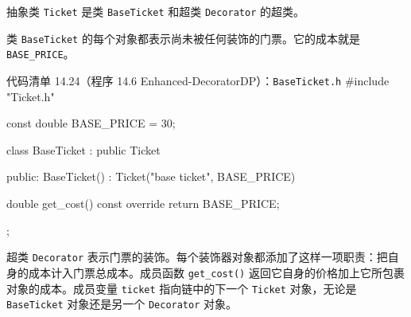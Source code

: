 抽象类 \texttt{Ticket} 是类 \texttt{Base\allowbreak{}Ticket} 和超类 \texttt{Decorator} 的超类。

\par

类 \texttt{Base\allowbreak{}Ticket} 的每个对象都表示尚未被任何装饰的门票。它的成本就是 \texttt{BASE\_\allowbreak{}PRICE}。

\begin{codeboxt}{代码清单 14.24（程序 14.6 Enhanced-DecoratorDP）：\texttt{Base\allowbreak{}Ticket.\allowbreak{}h}}
#include "Ticket.h"

const double BASE_PRICE = 30;

class BaseTicket : public Ticket
{
public:
    BaseTicket() : Ticket("base ticket", BASE_PRICE) {}

    double get_cost() const override { return BASE_PRICE; }
};
\end{codeboxt}

超类 \texttt{Decorator} 表示门票的装饰。每个装饰器对象都添加了这样一项职责：把自身的成本计入门票总成本。成员函数 \texttt{get\_\allowbreak{}cost(\allowbreak{})\allowbreak{}} 返回它自身的价格加上它所包裹对象的成本。成员变量 \texttt{ticket} 指向链中的下一个 \texttt{Ticket} 对象，无论是 \texttt{Base\allowbreak{}Ticket} 对象还是另一个 \texttt{Decorator} 对象。

